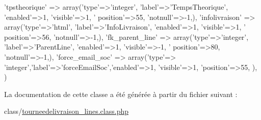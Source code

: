 \begin{DoxyCode}
        \textcolor{stringliteral}{'tpstheorique'} => array(\textcolor{stringliteral}{'type'}=>\textcolor{stringliteral}{'integer'}, \textcolor{stringliteral}{'label'}=>\textcolor{stringliteral}{'TempsTheorique'}, \textcolor{stringliteral}{'enabled'}=>1, \textcolor{stringliteral}{'visible'}=>1, \textcolor{stringliteral}{'
      position'}=>55, \textcolor{stringliteral}{'notnull'}=>-1,),
        \textcolor{stringliteral}{'infolivraison'} => array(\textcolor{stringliteral}{'type'}=>\textcolor{stringliteral}{'html'}, \textcolor{stringliteral}{'label'}=>\textcolor{stringliteral}{'InfoLivraison'}, \textcolor{stringliteral}{'enabled'}=>1, \textcolor{stringliteral}{'visible'}=>1, \textcolor{stringliteral}{'
      position'}=>56, \textcolor{stringliteral}{'notnull'}=>-1,),
        \textcolor{stringliteral}{'fk\_parent\_line'} => array(\textcolor{stringliteral}{'type'}=>\textcolor{stringliteral}{'integer'}, \textcolor{stringliteral}{'label'}=>\textcolor{stringliteral}{'ParentLine'}, \textcolor{stringliteral}{'enabled'}=>1, \textcolor{stringliteral}{'visible'}=>-1, \textcolor{stringliteral}{'
      position'}=>80, \textcolor{stringliteral}{'notnull'}=>-1,),
        \textcolor{stringliteral}{'force\_email\_soc'} => array(\textcolor{stringliteral}{'type'}=> \textcolor{stringliteral}{'integer'},\textcolor{stringliteral}{'label'}=>\textcolor{stringliteral}{'forceEmailSoc'},\textcolor{stringliteral}{'enabled'}=>1, \textcolor{stringliteral}{'visible'}=>1, \textcolor{stringliteral}{
      'position'}=>55, ),
    )
\end{DoxyCode}


La documentation de cette classe a été générée à partir du fichier suivant \+:\begin{DoxyCompactItemize}
\item 
class/\hyperlink{tourneedelivraison__lines_8class_8php}{tourneedelivraison\+\_\+lines.\+class.\+php}\end{DoxyCompactItemize}
